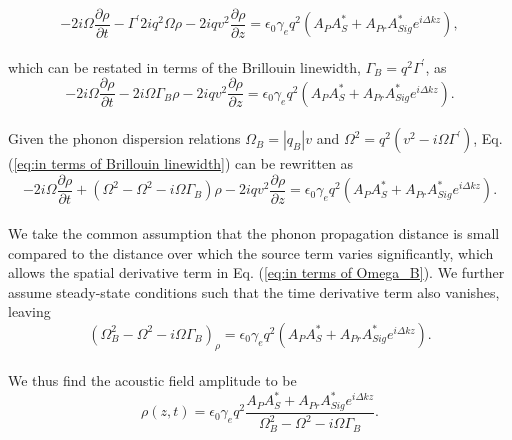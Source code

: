 \documentclass[%
  reprint,
  superscriptaddress,
  amsmath,amssymb,
  aps,
  prapplied,
]{revtex4-2}
\begin{document}
\\
\begin{equation}
    -2i\Omega\frac{\partial\rho}{\partial t} - \Gamma^{\prime}2iq^{2}\Omega\rho - 2iqv^{2}\frac{\partial\rho}{\partial z} = \epsilon_{0}\gamma_{e}q^{2}(A_{P}A_{S}^{*} + A_{Pr}A_{Sig}^{*}e^{i\Delta kz}),
\end{equation}
\\
which can be restated in terms of the Brillouin linewidth, $\Gamma_{B} = q^{2}\Gamma^{\prime}$, as
\\
\begin{equation}
    -2i\Omega\frac{\partial\rho}{\partial t} - 2i\Omega\Gamma_{B}\rho - 2iqv^{2}\frac{\partial\rho}{\partial z} = \epsilon_{0}\gamma_{e}q^{2}(A_{P}A_{S}^{*} + A_{Pr}A_{Sig}^{*}e^{i\Delta kz}).
    \label{eq:in terms of Brillouin linewidth}
\end{equation}
\\
Given the phonon dispersion relations $\Omega_{B} = |q_{B}|v$ and $\Omega^{2} = q^{2}\left(v^{2} - i\Omega\Gamma^{\prime}\right)$, Eq. (\ref{eq:in terms of Brillouin linewidth}) can be rewritten as
\\
\begin{equation}
    -2i\Omega\frac{\partial\rho}{\partial t} + \left(\Omega^{2} - \Omega^{2} - i\Omega\Gamma_{B}\right)\rho - 2iqv^{2}\frac{\partial\rho}{\partial z} = \epsilon_{0}\gamma_{e}q^{2}(A_{P}A_{S}^{*} + A_{Pr}A_{Sig}^{*}e^{i\Delta kz}).
    \label{eq:in terms of Omega_B}
\end{equation}
\\
We take the common assumption that the phonon propagation distance is small compared to the distance over which the source term varies significantly, which allows the spatial derivative term in Eq. (\ref{eq:in terms of Omega_B}). We further assume steady-state conditions such that the time derivative term also vanishes, leaving
\\
\begin{equation}
    (\Omega^{2}_{B} - \Omega^{2} - i\Omega\Gamma_{B})_{\rho} = \epsilon_{0}\gamma_{e}q^{2}(A_{P}A_{S}^{*} + A_{Pr}A_{Sig}^{*}e^{i\Delta kz}).
\end{equation}
\\
We thus find the acoustic field amplitude to be
\\
\begin{equation}
    \rho(z,t) = \epsilon_{0}\gamma_{e}q^{2}\frac{A_{P}A_{S}^{*} + A_{Pr}A_{Sig}^{*}e^{i\Delta kz}}{\Omega_{B}^{2} - \Omega^{2} - i\Omega\Gamma_{B}}.
    \label{eq:Acoustic field amplitude}
\end{equation}
\end{document}

